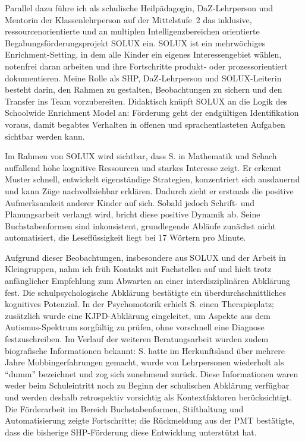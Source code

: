 \documentclass[ngerman, a4paper]{article}
\begin{document}
Parallel dazu führe ich als schulische Heilpädagogin, DaZ-Lehrperson und Mentorin
der Klassenlehrperson auf der Mittelstufe~2 das inklusive, ressourcenorientierte
und an multiplen Intelligenzbereichen orientierte Begabungsförderungsprojekt SOLUX
ein. SOLUX ist ein mehrwöchiges Enrichment-Setting, in dem alle Kinder ein eigenes
Interessengebiet wählen, notenfrei daran arbeiten und ihre Fortschritte produkt-
oder prozessorientiert dokumentieren. Meine Rolle als SHP, DaZ-Lehrperson und
SOLUX-Leiterin besteht darin, den Rahmen zu gestalten, Beobachtungen zu sichern
und den Transfer ins Team vorzubereiten. Didaktisch knüpft SOLUX an die Logik des
Schoolwide Enrichment Model an: Förderung geht der endgültigen Identifikation
voraus, damit begabtes Verhalten in offenen und sprachentlasteten Aufgaben sichtbar
werden kann.

Im Rahmen von SOLUX wird sichtbar, dass S. in Mathematik und Schach auffallend
hohe kognitive Ressourcen und starkes Interesse zeigt. Er erkennt Muster schnell,
entwickelt eigenständige Strategien, konzentriert sich ausdauernd und kann Züge
nachvollziehbar erklären. Dadurch zieht er erstmals die positive Aufmerksamkeit
anderer Kinder auf sich. Sobald jedoch Schrift- und Planungsarbeit verlangt wird,
bricht diese positive Dynamik ab. Seine Buchstabenformen sind inkonsistent,
grundlegende Abläufe zunächst nicht automatisiert, die Leseflüssigkeit liegt bei
17 Wörtern pro Minute.

Aufgrund dieser Beobachtungen, insbesondere aus SOLUX und der Arbeit in
Kleingruppen, nahm ich früh Kontakt mit Fachstellen auf und hielt trotz anfänglicher
Empfehlung zum Abwarten an einer interdisziplinären Abklärung fest. Die
schulpsychologische Abklärung bestätigte ein überdurchschnittliches kognitives
Potenzial. In der Psychomotorik erhielt S. einen Therapieplatz; zusätzlich wurde
eine KJPD-Abklärung eingeleitet, um Aspekte aus dem Autismus-Spektrum sorgfältig
zu prüfen, ohne vorschnell eine Diagnose festzuschreiben. Im Verlauf der weiteren
Beratungsarbeit wurden zudem biografische Informationen bekannt: S. hatte im
Herkunftsland über mehrere Jahre Mobbingerfahrungen gemacht, wurde von
Lehrpersonen wiederholt als \enquote{dumm} bezeichnet und zog sich zunehmend
zurück. Diese Informationen waren weder beim Schuleintritt noch zu Beginn der
schulischen Abklärung verfügbar und werden deshalb retrospektiv vorsichtig als
Kontextfaktoren berücksichtigt. Die Förderarbeit im Bereich Buchstabenformen,
Stifthaltung und Automatisierung zeigte Fortschritte; die Rückmeldung aus der
PMT bestätigte, dass die bisherige SHP-Förderung diese Entwicklung unterstützt
hat.
\end{document}

